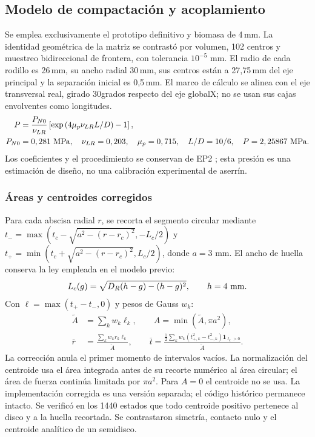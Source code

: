 \subsection{Modelo de compactación y acoplamiento}
\label{app:prototipo_A3}
Se emplea exclusivamente el prototipo definitivo y biomasa de 4\,mm.
La identidad geométrica de la matriz se contrastó por volumen, 102 centros
y muestreo bidireccional de frontera, con tolerancia $10^{-5}$ mm.
El radio de cada rodillo es 26\,mm, su ancho radial 30\,mm, sus centros están
a 27,75\,mm del eje principal y la separación inicial es 0,5\,mm.
El marco de cálculo se alinea con el eje transversal real, girado 30grados
respecto del eje globalX; no se usan sus cajas envolventes como longitudes.
\begin{align}
 P&=\frac{P_{N0}}{\nu_{LR}}\left[\exp\left(4\mu_p\nu_{LR}L/D\right)-1\right],\\
 P_{N0}&=0,281\ {\rm MPa},\quad\nu_{LR}=0,203,\quad\mu_p=0,715,
 \quad L/D=10/6,\quad P=2,25867\ {\rm MPa}.
\end{align}
Los coeficientes y el procedimiento se conservan de EP2
\cite{equipo_entrega2_2026}; esta presión es una estimación de diseño,
no una calibración experimental de aserrín.

\subsubsection*{Áreas y centroides corregidos}
Para cada abscisa radial $r$, se recorta el segmento circular mediante
$t_-=\max(t_c-\sqrt{a^2-(r-r_c)^2},-L_c/2)$ y
$t_+=\min(t_c+\sqrt{a^2-(r-r_c)^2},L_c/2)$, donde $a=3$ mm.
El ancho de huella conserva la ley empleada en el modelo previo:
\begin{equation}
 L_c(g)=\sqrt{D_R(h-g)-(h-g)^2},\qquad h=4\ {\rm mm}.
\end{equation}
Con $\ell=\max(t_+-t_-,0)$ y pesos de Gauss $w_k$:
\begin{align}
 \widetilde A&=\sum_k w_k\ell_k,\qquad A=\min(\widetilde A,\pi a^2),\\
 \bar r&=\frac{\sum_k w_k r_k\ell_k}{\widetilde A},\qquad
 \bar t=\frac{\tfrac 12\sum_k w_k(t_{+,k}^2-t_{-,k}^2)
 \mathbf 1_{\ell_k>0}}{\widetilde A}.
\end{align}
La corrección anula el primer momento de intervalos vacíos. La
normalización del centroide usa el área integrada antes de su recorte
numérico al área circular; el área de fuerza continúa limitada por
$\pi a^2$. Para $A=0$ el centroide no se usa. La implementación corregida
es una versión separada; el código histórico permanece intacto.
Se verificó en los 1440 estados que todo centroide positivo pertenece
al disco y a la huella recortada. Se contrastaron simetría, contacto nulo
y el centroide analítico de un semidisco.

